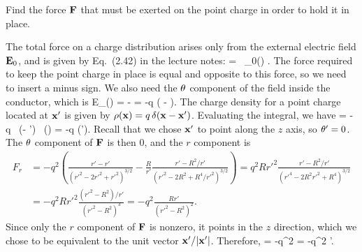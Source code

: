 \newcommand{\vEo}{\vE_0}
\newcommand{\del}{\delta}
\newcommand{\Etht}{E_\tht}
\newcommand{\Fr}{F_r}

\begin{problem}
	Find the force $\mathbf{F}$ that must be exerted on the point charge in order to hold it in place.
\end{problem}

\begin{solution}
	The total force on a charge distribution arises only from the external electric field $\vEo$, and is given by Eq.~(2.42) in the lecture notes:
	\beq
		\vF = \int \rhox \, \vEo(\vx) \dcx.
	\eeq
	The force required to keep the point charge in place is equal and opposite to this force, so we need to insert a minus sign.  We also need the $\theta$ component of the field inside the conductor, which is
	\beq
		\Etht(\vx) = - \pdv{\Gdxxp}{\tht}
		= -q \left(  -  \right).
	\eeq
	The charge density for a point charge located at $\mathbf{x}'$ is given by $\rho(\mathbf{x}) = q \, \delta(\mathbf{x} - \mathbf{x}')$.  Evaluating the integral, we have
	\beq
		\vF = -\int q \, \delta(\vx - \vx') \, \vE(\vx) \dcx
		= -q \vE(\vx').
	\eeq
	Recall that we chose $\mathbf{x}'$ to point along the $z$ axis, so $\theta' = 0$.  The $\theta$ component of $\mathbf{F}$ is then $0$, and the $r$ component is
	\begin{align*}
		\Fr &= -q^2 \left( \frac{r' - r'}{({r'}^2 - 2 {r'}^2 + {r'}^2)^{3/2}} - \frac{R}{r'} \frac{r' - R^2 / r'}{({r'}^2 - 2 R^2 + R^4 / {r'}^2)^{3/2}} \right)
		= q^2 R {r'}^2 \frac{r' - R^2 / r'}{({r'}^4 - 2 R^2 {r'}^2 + R^4)^{3/2}} \\
		&= -q^2 R {r'}^2 \frac{({r'}^2 - R^2) / r'}{({r'}^2 - R^2)^3}
		= -q^2 \frac{R r'}{({r'}^2 - R^2)^2}.
	\end{align*}
	Since only the $r$ component of $\mathbf{F}$ is nonzero, it points in the $z$ direction, which we chose to be equivalent to the unit vector $\mathbf{x}' / \abs{\mathbf{x}'}$.  Therefore,
	\beq
		\vF = -q^2  
		= -q^2  \vx'.
	\eeq
\end{solution}
